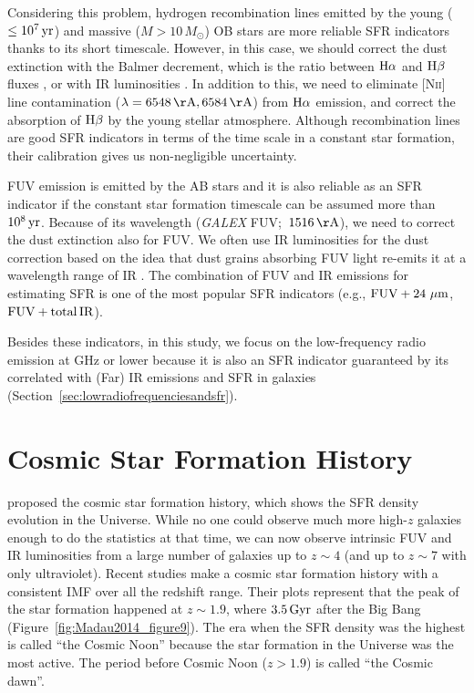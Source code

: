 Considering this problem, hydrogen recombination lines emitted by the young ($\leq 10^7\,\mathrm{yr}$) and massive ($M > 10\,M_{\odot}$) OB stars are more reliable SFR indicators thanks to its short timescale.
However, in this case, we should correct the dust extinction with the Balmer decrement, which is the ratio between $\mathrm{H\alpha}$ and $\mathrm{H\beta}$ fluxes \citep{Lequeux1981}, or with IR luminosities \citep{Kennicutt2009}.
In addition to this, we need to eliminate [N\textsc{ii}] line contamination ($\lambda = 6548\,\mr{\AA}, 6584\,\mr{\AA}$) from $\mathrm{H}\alpha$ emission, and correct the absorption of $\mathrm{H\beta}$ by the young stellar atmosphere.
Although recombination lines are good SFR indicators in terms of the time scale in a constant star formation, their calibration gives us non-negligible uncertainty.

FUV emission is emitted by the AB stars and it is also reliable as an SFR indicator if the constant star formation timescale can be assumed more than $10^8\,\mathrm{yr}$.
Because of its wavelength ({\it GALEX\/} FUV;~$1516\,\mr{\AA}$), we need to correct the dust extinction also for FUV\@.
We often use IR luminosities for the dust correction based on the idea that dust grains absorbing FUV light re-emits it at a wavelength range of IR \citep{Kennicutt1998, Murphy2011}.
The combination of FUV and IR emissions for estimating SFR is one of the most popular SFR indicators (e.g., $\mathrm{FUV + 24\,\,\mathrm{\mu m}}$, $\mathrm{FUV + total\,IR}$).

Besides these indicators, in this study, we focus on the low-frequency radio emission at GHz or lower because it is also an SFR indicator guaranteed by its correlated with (Far) IR emissions and SFR in galaxies (Section~\ref{sec:lowradiofrequenciesandsfr}).





\section{Cosmic Star Formation History}\label{sec:cosmicstarformationhistory}

\citet{Tinsley1980} proposed the cosmic star formation history, which shows the SFR density evolution in the Universe.
While no one could observe much more high-$z$ galaxies enough to do the statistics at that time, we can now observe intrinsic FUV and IR luminosities from a large number of galaxies up to $z \sim 4$ (and up to $z \sim 7$ with only ultraviolet).
    Recent studies \citep{Hopkins2006, Madau2014} make a cosmic star formation history with a consistent IMF over all the redshift range.
Their plots represent that the peak of the star formation happened at $z\sim1.9$, where $3.5\,\mathrm{Gyr}$ after the Big Bang (Figure~\ref{fig:Madau2014_figure9}).
The era when the SFR density was the highest is called ``the Cosmic Noon'' because the star formation in the Universe was the most active.
The period before Cosmic Noon ($z > 1.9$) is called  ``the Cosmic dawn''.

